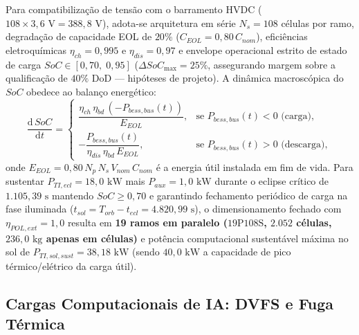 Para compatibilização de tensão com o barramento HVDC ($108 \times 3{,}6\text{ V} = 388{,}8\text{ V}$), adota-se arquitetura em série $N_s = 108$ células por ramo, degradação de capacidade EOL de $20\%$ ($C_{EOL} = 0{,}80\,C_{nom}$), eficiências eletroquímicas $\eta_{ch} = 0{,}995$ e $\eta_{dis} = 0{,}97$ e envelope operacional estrito de estado de carga $SoC \in [0{,}70,\; 0{,}95]$ ($\Delta SoC_{\max} = 25\%$, assegurando margem sobre a qualificação de $40\%$ DoD — hipóteses de projeto). A dinâmica macroscópica do $SoC$ obedece ao balanço energético:
\begin{equation}
    \frac{\mathrm{d}\,SoC}{\mathrm{d}t} =
    \begin{cases}
        \dfrac{\eta_{ch}\,\eta_{bd}\,(-P_{bess,bus}(t))}{E_{EOL}}, & \text{se } P_{bess,bus}(t) < 0 \text{ (carga)}, \\[10pt]
        -\dfrac{P_{bess,bus}(t)}{\eta_{dis}\,\eta_{bd}\,E_{EOL}}, & \text{se } P_{bess,bus}(t) > 0 \text{ (descarga)},
    \end{cases}
    \label{eq:dinamica_soc}
\end{equation}
onde $E_{EOL} = 0{,}80\, N_p\, N_s\, V_{nom}\, C_{nom}$ é a energia útil instalada em fim de vida. Para sustentar $P_{TI,ecl} = 18{,}0\text{ kW}$ mais $P_{aux} = 1{,}0\text{ kW}$ durante o eclipse crítico de $1.105{,}39\text{ s}$ mantendo $SoC \ge 0{,}70$ e garantindo fechamento periódico de carga na fase iluminada ($t_{sol} = T_{orb} - t_{ecl} = 4.820{,}99\text{ s}$), o dimensionamento fechado com $\eta_{POL,ext} = 1{,}0$ resulta em \textbf{19 ramos em paralelo ($19\text{P}108\text{S}$, $2.052$ células, $236{,}0\text{ kg}$ apenas em células)} e potência computacional sustentável máxima no sol de \textbf{$P_{TI,sol,sust} = 38{,}18\text{ kW}$} (sendo $40{,}0\text{ kW}$ a capacidade de pico térmico/elétrico da carga útil).

\subsection{Cargas Computacionais de IA: DVFS e Fuga Térmica}
\label{sec:modelo_ia}

